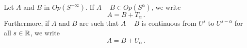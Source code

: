 \documentclass[a4paper]{article}
\begin{document}
\begin{Def}
	Let $A$ and $B$ in $\textit{Op}(S^{-\infty})$. If $A - B \in \textit{Op}(S^\alpha)$, we write 
	\[A = B + T_\alpha \,.\]
	Furthermore, if $A$ and $B$ are such that $A - B$ is continuous from $U^s$ to $U^{s- \alpha}$ for all $s \in \mathbb{R}$, we write 
	\[A = B + U_\alpha\,.\]
\end{Def}
%
%
%
%	
%
%
%
%
%
\end{document}
